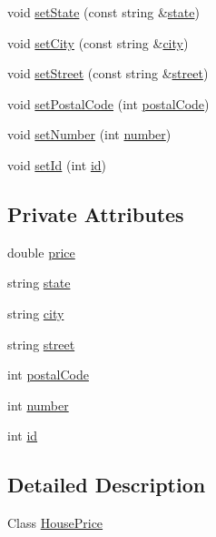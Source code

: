 \begin{DoxyCompactItemize}
\item 
void \hyperlink{class_house_price_af53f5b0954fdea830d241f7a5354464c}{set\+State} (const string \&\hyperlink{class_house_price_a865659102def4e722908ad3e5d7f3ae4}{state})
\item 
void \hyperlink{class_house_price_ac955167beb435ac335ed5fa72e0e006d}{set\+City} (const string \&\hyperlink{class_house_price_a3b62ff8d207b47b12850cd7ebce32b44}{city})
\item 
void \hyperlink{class_house_price_a959c75ef1193d885fca7c3410db29ee9}{set\+Street} (const string \&\hyperlink{class_house_price_abceda72673b6c6c9e10c571407cdf3c2}{street})
\item 
void \hyperlink{class_house_price_aee2efd36013264908af85bb5557eb9f2}{set\+Postal\+Code} (int \hyperlink{class_house_price_a870b1e53f5d0595ffe9d693dcba0f2d1}{postal\+Code})
\item 
void \hyperlink{class_house_price_ab5de6255cccde277c23b9b33efb6b825}{set\+Number} (int \hyperlink{class_house_price_af6ec9e5bd9c52ac029e4553290b1d183}{number})
\item 
void \hyperlink{class_house_price_a43fead2f6a533d6f1f59c36e5f4e6c83}{set\+Id} (int \hyperlink{class_house_price_a6066800e48549e0b344c122fb1b9c108}{id})
\end{DoxyCompactItemize}
\subsection*{Private Attributes}
\begin{DoxyCompactItemize}
\item 
double \hyperlink{class_house_price_a0e69a53fa6e4a2dcc8443107eda02e9a}{price}
\item 
string \hyperlink{class_house_price_a865659102def4e722908ad3e5d7f3ae4}{state}
\item 
string \hyperlink{class_house_price_a3b62ff8d207b47b12850cd7ebce32b44}{city}
\item 
string \hyperlink{class_house_price_abceda72673b6c6c9e10c571407cdf3c2}{street}
\item 
int \hyperlink{class_house_price_a870b1e53f5d0595ffe9d693dcba0f2d1}{postal\+Code}
\item 
int \hyperlink{class_house_price_af6ec9e5bd9c52ac029e4553290b1d183}{number}
\item 
int \hyperlink{class_house_price_a6066800e48549e0b344c122fb1b9c108}{id}
\end{DoxyCompactItemize}


\subsection{Detailed Description}
Class \hyperlink{class_house_price}{House\+Price} 

